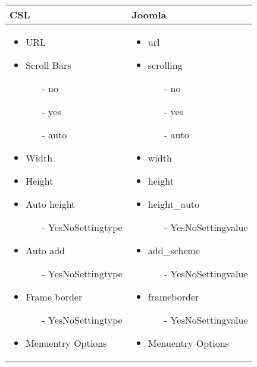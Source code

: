 \begin{minipage}{0.7\textwidth}
\begin{tabular}{|p{} | p{}|}
\hline
\textbf{CSL} & \textbf{Joomla} \\ 
\hline
\begin{itemize}
\item URL 
\item Scroll Bars
\begin{enumerate}
	\item[-] no
	\item[-] yes
	\item[-] auto
\end{enumerate} 
\item Width 
\item Height 
\item Auto height
\begin{enumerate}
	\item[-] YesNoSettingtype
\end{enumerate} 
\item Auto add
\begin{enumerate}
	\item[-] YesNoSettingtype
\end{enumerate}
\item Frame border
\begin{enumerate}
	\item[-] YesNoSettingtype
\end{enumerate}
\item Menuentry Options
\end{itemize}
 & 
\begin{itemize}
\item url 
\item scrolling
\begin{enumerate}
	\item[-] no
	\item[-] yes
	\item[-] auto
\end{enumerate} 
\item width 
\item height 
\item height\_auto
\begin{enumerate}
	\item[-] YesNoSettingvalue
\end{enumerate} 
\item add\_scheme
\begin{enumerate}
	\item[-] YesNoSettingvalue
\end{enumerate}
\item frameborder
\begin{enumerate}
	\item[-] YesNoSettingvalue
\end{enumerate}
\item Menuentry Options
\end{itemize}
\\
\hline
\end{tabular}
\end{minipage}

